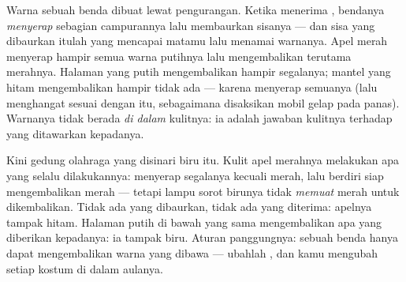 \begin{proposition}\label{prop:g8:colors-spectra:objectcolor}
Warna sebuah benda  dibuat lewat pengurangan. Ketika menerima
, bendanya \emph{menyerap} sebagian campurannya lalu membaurkan
sisanya --- dan sisa yang dibaurkan itulah yang mencapai matamu lalu
menamai warnanya. Apel merah menyerap hampir semua warna 
putihnya lalu mengembalikan terutama merahnya. Halaman yang putih
mengembalikan hampir segalanya; mantel yang hitam mengembalikan hampir
tidak ada --- karena menyerap semuanya (lalu menghangat sesuai dengan
itu, sebagaimana disaksikan mobil gelap pada  panas). Warnanya
tidak berada \emph{di dalam} kulitnya: ia adalah jawaban kulitnya
terhadap  yang ditawarkan kepadanya.
\end{proposition}

\begin{example}\label{ex:g8:colors-spectra:gym}
Kini gedung olahraga yang disinari biru itu. Kulit apel merahnya
melakukan apa yang selalu dilakukannya: menyerap segalanya kecuali
merah, lalu berdiri siap mengembalikan merah --- tetapi lampu sorot
birunya tidak \emph{memuat} merah untuk dikembalikan. Tidak ada yang
dibaurkan, tidak ada yang diterima: apelnya tampak hitam. Halaman
putih di bawah  yang sama mengembalikan apa yang diberikan
kepadanya: ia tampak biru. Aturan panggungnya: sebuah benda hanya
dapat mengembalikan warna yang dibawa  --- ubahlah ,
dan kamu mengubah setiap kostum di dalam aulanya.
\end{example}

